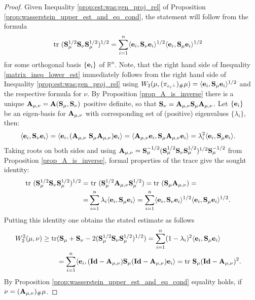 \documentclass{amsart}
\numberwithin{equation}{section}
\newcommand\bA{{\bf A}}
\newcommand\bS{{\bf S}}
\newcommand\R{{\mathbb R}}
\newcommand\id{{\operatorname{\bf Id}}}
\newcommand\tr{{\operatorname{tr}}}
\theoremstyle{plain}
\theoremstyle{definition}
\begin{document}
\begin{proof}
Given Inequality \ref{prop:est:was:gen_proj_rel} of Proposition \ref{prop:wasserstein_upper_est_and_eq_cond}, the statement will follow from the formula 
\[ \tr\ ({\bf S}_{\mu}^{1/2}{\bf S}_{\nu}{\bf S}_{\mu}^{1/2})^{1/2}=\sum^n_{i=1}\langle {\bf e}_i, {\bf S}_{\nu} {\bf e}_i\rangle^{1/2} \langle {\bf e}_i, {\bf S}_{\mu} {\bf e}_i\rangle^{1/2} 
\]
for some orthogonal basis $\{ {\bf e}_i \}$ of $\R^n$. Note, that the right hand side of Inequality \ref{matrix_ineq_lower_est} immediately follows from the right hand side of Inequality \ref{prop:est:was:gen_proj_rel} using 
$ W_2(\mu, (\pi_{{e_i}^{\perp}})_{\#}\mu) = \langle {\bf e}_i, {\bf S}_{\mu} {\bf e}_i\rangle^{1/2}$ and the respective formula for $\nu$. 
By Proposition \ref{prop_A_is_inverse} there is a unique $\bA_{\mu, \nu}=\bA(\bS_{\mu},\bS_{\nu})$ positive definite, so that  $\bS_{\nu}= \bA_{\mu, \nu} \bS_{\mu}\bA_{\mu, \nu}$. Let $\{ {\bf e}_i \}$ be an eigen-basis for $\bA_{\mu, \nu}$ with corresponding set of 
(positive) eigenvalues $\{\lambda_i\}$, then:   
 $$
 \langle {\bf e}_i, {\bf S}_{\nu} {\bf e}_i\rangle= \langle {\bf e}_i, (\bA_{\mu, \nu} \ {\bf S}_{\mu} \bA_{\mu, \nu}){\bf e}_i\rangle = \langle \bA_{\mu, \nu} {\bf e}_i, {\bf S}_{\mu} \bA_{\mu, \nu} {\bf e}_i\rangle = 
\lambda_i^2 \langle {\bf e}_i, {\bf S}_{\mu} {\bf e}_i\rangle.  
$$
Taking roots on both sides and using $\bA_{\mu, \nu}= {\bf S}_{\mu}^{-1/2}({\bf S}_{\mu}^{1/2}{\bf S}_{\nu}{\bf S}_{\mu}^{1/2})^{1/2} {\bf S}_{\mu}^{-1/2}$ from Proposition \ref{prop_A_is_inverse}, formal properties of the trace give the sought identity:  
\[ 
\begin{split}
     \tr\ ({\bf S}_{\mu}^{1/2}{\bf S}_{\nu}{\bf S}_{\mu}^{1/2})^{1/2} =& \ \tr\ ({\bf S}_{\mu}^{1/2} \bA_{\mu, \nu} {\bf S}_{\mu}^{1/2})
= \tr\ ({\bf S}_{\mu} \bA_{\mu, \nu} )=\\ 
=& \sum^n_{i=1}\lambda_i \langle {\bf e}_i, {\bf S}_{\mu} {\bf e}_i\rangle=\sum^n_{i=1}\langle {\bf e}_i, {\bf S}_{\nu} {\bf e}_i\rangle^{1/2} \langle {\bf e}_i, {\bf S}_{\mu} {\bf e}_i\rangle^{1/2}. 
\end{split}
\]
Putting this identity one obtains the stated estimate as follows
\[
\begin{split}
 W^2_2(\mu,\nu)\geq \tr &({\bf S}_{\mu}+{\bf S}_{\nu}-2({\bf S}_{\mu}^{1/2}{\bf S}_{\nu}{\bf S}_{\mu}^{1/2})^{1/2})= 
\sum^n_{i=1}(1-\lambda_i)^2 \langle {\bf e}_i, {\bf S}_{\mu} {\bf e}_i\rangle 
\\ 
&=\sum^n_{i=1} \langle {\bf e}_i,({\bf \id}-\bA_{\mu, \nu}) {\bf S}_{\mu}({\bf \id}-\bA_{\mu, \nu}) {\bf e}_i\rangle
= \tr\ {\bf S}_{\mu}({\bf \id}-\bA_{\mu, \nu})^2.
\end{split}
\]
By Proposition \ref{prop:wasserstein_upper_est_and_eq_cond} equality holds, if $\nu=(\bA_{\mu,\nu})_{\#}\mu$. 
\end{proof}
\end{document}
